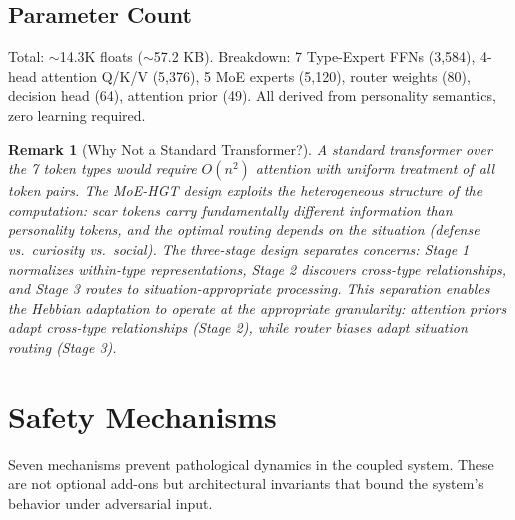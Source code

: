 \documentclass[11pt]{article}
\newtheorem{remark}[theorem]{Remark}
\begin{document}
\subsection{Parameter Count}

Total: $\sim$14.3K floats ($\sim$57.2 KB). Breakdown: 7 Type-Expert FFNs (3,584), 4-head attention Q/K/V (5,376), 5 MoE experts (5,120), router weights (80), decision head (64), attention prior (49). All derived from personality semantics, zero learning required.

\begin{remark}[Why Not a Standard Transformer?]
A standard transformer over the 7 token types would require $O(n^2)$ attention with uniform treatment of all token pairs. The MoE-HGT design exploits the heterogeneous structure of the computation: scar tokens carry fundamentally different information than personality tokens, and the optimal routing depends on the \emph{situation} (defense vs.\ curiosity vs.\ social). The three-stage design separates concerns: Stage 1 normalizes within-type representations, Stage 2 discovers cross-type relationships, and Stage 3 routes to situation-appropriate processing. This separation enables the Hebbian adaptation to operate at the appropriate granularity: attention priors adapt cross-type relationships (Stage 2), while router biases adapt situation routing (Stage 3).
\end{remark}

\section{Safety Mechanisms}
\label{sec:safety}

Seven mechanisms prevent pathological dynamics in the coupled system. These are not optional add-ons but architectural invariants that bound the system's behavior under adversarial input.
\end{document}
